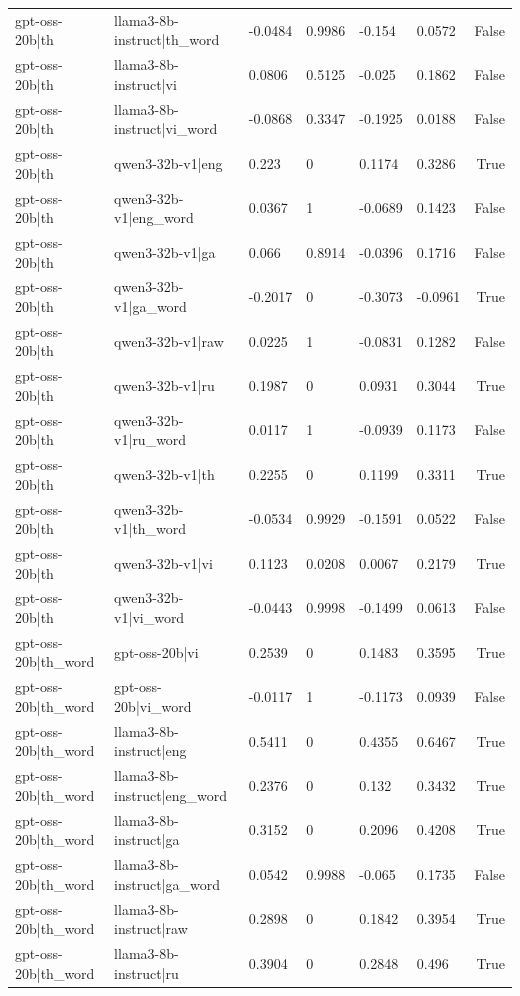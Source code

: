 \begin{table}
\begin{tabular}{llllllr}
gpt-oss-20b|th & llama3-8b-instruct|th_word & -0.0484 & 0.9986 & -0.154 & 0.0572 & False \\
gpt-oss-20b|th & llama3-8b-instruct|vi & 0.0806 & 0.5125 & -0.025 & 0.1862 & False \\
gpt-oss-20b|th & llama3-8b-instruct|vi_word & -0.0868 & 0.3347 & -0.1925 & 0.0188 & False \\
gpt-oss-20b|th & qwen3-32b-v1|eng & 0.223 & 0 & 0.1174 & 0.3286 & True \\
gpt-oss-20b|th & qwen3-32b-v1|eng_word & 0.0367 & 1 & -0.0689 & 0.1423 & False \\
gpt-oss-20b|th & qwen3-32b-v1|ga & 0.066 & 0.8914 & -0.0396 & 0.1716 & False \\
gpt-oss-20b|th & qwen3-32b-v1|ga_word & -0.2017 & 0 & -0.3073 & -0.0961 & True \\
gpt-oss-20b|th & qwen3-32b-v1|raw & 0.0225 & 1 & -0.0831 & 0.1282 & False \\
gpt-oss-20b|th & qwen3-32b-v1|ru & 0.1987 & 0 & 0.0931 & 0.3044 & True \\
gpt-oss-20b|th & qwen3-32b-v1|ru_word & 0.0117 & 1 & -0.0939 & 0.1173 & False \\
gpt-oss-20b|th & qwen3-32b-v1|th & 0.2255 & 0 & 0.1199 & 0.3311 & True \\
gpt-oss-20b|th & qwen3-32b-v1|th_word & -0.0534 & 0.9929 & -0.1591 & 0.0522 & False \\
gpt-oss-20b|th & qwen3-32b-v1|vi & 0.1123 & 0.0208 & 0.0067 & 0.2179 & True \\
gpt-oss-20b|th & qwen3-32b-v1|vi_word & -0.0443 & 0.9998 & -0.1499 & 0.0613 & False \\
gpt-oss-20b|th_word & gpt-oss-20b|vi & 0.2539 & 0 & 0.1483 & 0.3595 & True \\
gpt-oss-20b|th_word & gpt-oss-20b|vi_word & -0.0117 & 1 & -0.1173 & 0.0939 & False \\
gpt-oss-20b|th_word & llama3-8b-instruct|eng & 0.5411 & 0 & 0.4355 & 0.6467 & True \\
gpt-oss-20b|th_word & llama3-8b-instruct|eng_word & 0.2376 & 0 & 0.132 & 0.3432 & True \\
gpt-oss-20b|th_word & llama3-8b-instruct|ga & 0.3152 & 0 & 0.2096 & 0.4208 & True \\
gpt-oss-20b|th_word & llama3-8b-instruct|ga_word & 0.0542 & 0.9988 & -0.065 & 0.1735 & False \\
gpt-oss-20b|th_word & llama3-8b-instruct|raw & 0.2898 & 0 & 0.1842 & 0.3954 & True \\
gpt-oss-20b|th_word & llama3-8b-instruct|ru & 0.3904 & 0 & 0.2848 & 0.496 & True \\

\end{tabular}
\end{table}
